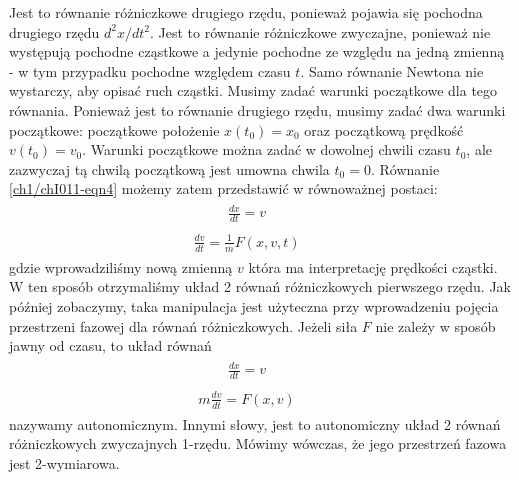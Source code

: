 \documentclass[a4paper,12pt,polish]{sphinxmanual}
\begin{document}
Jest to równanie różniczkowe drugiego rzędu, ponieważ pojawia się  pochodna drugiego rzędu $d^2x/dt^2$.
Jest to równanie różniczkowe zwyczajne, ponieważ  nie występują pochodne cząstkowe a jedynie pochodne ze względu na jedną zmienną - w tym przypadku pochodne względem czasu $t$.
Samo równanie Newtona nie wystarczy, aby opisać ruch cząstki. Musimy zadać warunki początkowe dla tego równania. Ponieważ jest to równanie drugiego rzędu, musimy zadać dwa warunki początkowe: początkowe położenie $x(t_0) = x_0$ oraz początkową  prędkość $v(t_0) = v_0$. Warunki początkowe można zadać w dowolnej chwili czasu $t_0$, ale zazwyczaj tą chwilą początkową jest umowna chwila  $t_0 = 0$.
Równanie \eqref{ch1/chI011-eqn4} możemy zatem przedstawić w równoważnej postaci:
\label{ch1/chI011:equation-eqn5}\begin{gather}
\begin{split}\frac{dx}{dt} = v \qquad\end{split}\label{ch1/chI011-eqn5}
\end{gather}\label{ch1/chI011:equation-eqn6}\begin{gather}
\begin{split}\frac{dv}{dt} = \frac{1}{m} F\left(x, v, t\right) \qquad\end{split}\label{ch1/chI011-eqn6}
\end{gather}
gdzie wprowadziliśmy nową zmienną $v$ która ma interpretację prędkości cząstki. W ten sposób otrzymaliśmy układ 2 równań różniczkowych pierwszego rzędu. Jak później zobaczymy, taka manipulacja jest użyteczna przy wprowadzeniu pojęcia przestrzeni fazowej dla równań różniczkowych.  Jeżeli siła $F$ nie zależy w sposób jawny od czasu, to układ równań
\label{ch1/chI011:equation-eqn7}\begin{gather}
\begin{split}\frac{dx}{dt} = v \qquad\end{split}\label{ch1/chI011-eqn7}
\end{gather}\label{ch1/chI011:equation-eqn8}\begin{gather}
\begin{split} m \frac{dv}{dt} =  F(x, v) \qquad\end{split}\label{ch1/chI011-eqn8}
\end{gather}
nazywamy autonomicznym. Innymi słowy, jest to autonomiczny układ 2 równań różniczkowych zwyczajnych 1-rzędu. Mówimy wówczas, że jego przestrzeń fazowa jest 2-wymiarowa.
\end{document}

